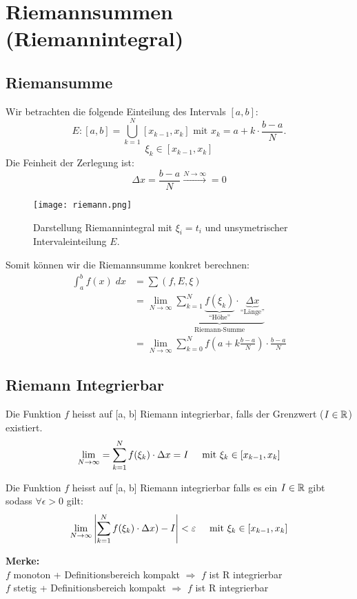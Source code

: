 \section{Riemannsummen (Riemannintegral)}
\subsection{Riemansumme}
Wir betrachten die folgende Einteilung des Intervals $[a,b]$:\[
E: [a,b] = \bigcup_{k=1}^{N}[x_{k-1}, x_k] \text{ mit } x_k = a + k \cdot \frac{b-a}{N}.
\]
\[
	\xi_k \in [x_{k-1}, x_k]
\]
Die Feinheit der Zerlegung ist:
\[
\Delta x = \frac{b-a}{N} \xrightarrow{N \to \infty} = 0
\]


\begin{figure}
	\texttt{[image: riemann.png]}
	\caption[Bildunterschrift]{Darstellung Riemannintegral mit $\xi_i = t_i$ und unsymetrischer Intervaleinteilung $E$.}
\end{figure}

Somit können wir die Riemannsumme konkret berechnen:
\begin{align*}
\int_a^b f(x)\;dx &=\sum (f,E,\xi)\\
&= \lim_{N \to \infty} \underbrace{\sum_{k=1}^{N}
	\underbrace{f(\xi_k)}_{\text{``Höhe''}} \cdot \underbrace{\Delta x}_{\text{``Länge''}}}_{\text{Riemann-Summe}}\\
&= \lim_{N \to \infty} \sum_{k=0}^{N} {f(a + k\frac{b-a}{N})} \cdot \frac{b-a}{N}
\end{align*}


\subsection{Riemann Integrierbar}
\begin{definition}  Die Funktion $f$ heisst auf [a, b] Riemann integrierbar, falls der Grenzwert ($I \in \R$) existiert.
\[
	\lim_{N \to \infty} = \sum_{k = 1}^N f(\xi_k) \cdot \Delta x = I \hspace{0.5cm} \text{mit } \xi_k \in [x_{k-1}, x_k]
\]

\end{definition}

\begin{definition} 
Die Funktion $f$ heisst auf [a, b] Riemann integrierbar falls es ein $I \in \R$ gibt sodass $\forall \epsilon > 0$ gilt:
\[
	\lim_{N \to \infty} \left| \sum_{k = 1}^N f(\xi_k) \cdot \Delta x) - I \right| < \epsilon \hspace{0.5cm} \text{mit } \xi_k \in [x_{k-1}, x_k]
\]
\end{definition}
\textbf{Merke:}\\
$f$ monoton + Definitionsbereich kompakt $\Rightarrow$ $f$ ist R integrierbar\\
$f$ stetig + Definitionsbereich kompakt $\Rightarrow$ $f$ ist R integrierbar

